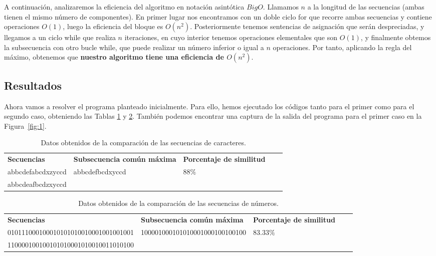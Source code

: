 A continuación, analizaremos la eficiencia del algoritmo en notación asintótica $BigO$.
Llamamos $n$ a la longitud de las secuencias (ambas tienen el mismo número de componentes). En primer lugar nos encontramos con un doble ciclo for que recorre ambas
secuencias y contiene operaciones $O(1)$, luego la eficiencia del bloque es $O(n^{2})$.
Posteriormente tenemos sentencias de asignación que serán despreciadas, y llegamos a un
ciclo while que realiza $n$ iteraciones, en cuyo interior tenemos operaciones elementales que son $O(1)$, y finalmente obtemos la subsecuencia con otro bucle while, que puede realizar un número inferior o igual a $n$ operaciones. Por tanto, aplicando la regla del máximo, obtenemos que \textbf{nuestro algoritmo tiene una eficiencia de $O(n^{2})$}.
 

\subsection{Resultados}

Ahora vamos a resolver el programa planteado inicialmente. Para ello,
hemos ejecutado los códigos tanto para el primer como para el segundo caso,
obteniendo las Tablas \ref{tab:s1} y \ref{tab:s2}. También podemos encontrar
una captura de la salida del programa para el primer caso en la Figura~\ref{fig:1}. 

\begin{table}[h]
    \footnotesize
    \centering
	\begin{tabular}{|l|l|l|ll}
		\cline{1-3}
		\textbf{Secuencias}                           & \textbf{Subsecuencia común máxima}                       & \textbf{Porcentaje de similitud}     &  &  \\ \cline{1-3}
		abbcdefabcdxzyccd                    & \multirow{2}{*}{abbcdefbcdxyccd}                & \multirow{2}{*}{$88 \%$}    &  &  \\ \cline{1-1}
		abbcdeafbcdzxyccd                    &                                                 &                             &  &  \\ \cline{1-3}
	\end{tabular}
  \caption{Datos obtenidos de la comparación de las secuencias de caracteres.}
  \label{tab:s1}
\end{table}

\begin{table}[h]
  \footnotesize
  \centering
\begin{tabular}{|l|l|l|ll}
  \cline{1-3}
  \textbf{Secuencias}                           & \textbf{Subsecuencia común máxima}                       & \textbf{Porcentaje de similitud}     &  &  \\ \cline{1-3}
  010111000100010101010010001001001001 & \multirow{2}{*}{100001000101010001000100100100} & \multirow{2}{*}{$83.33 \%$} &  &  \\ \cline{1-1}
  110000100100101010001010010011010100 &                                                 &                             &  &  \\ \cline{1-3}
\end{tabular}
\caption{Datos obtenidos de la comparación de las secuencias de números.}
\label{tab:s2}
\end{table}

